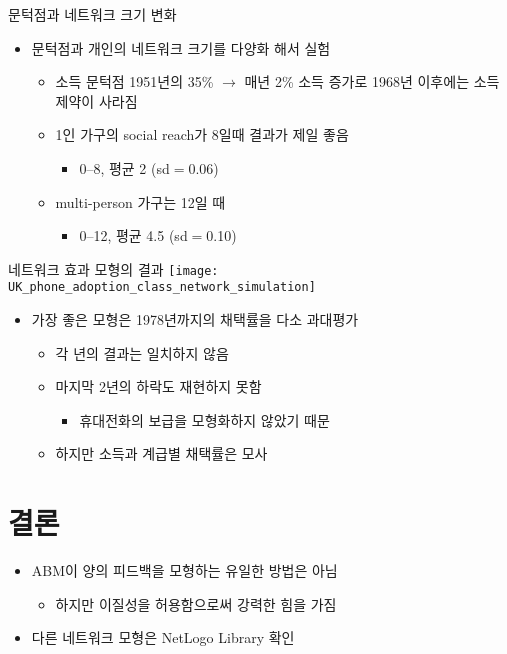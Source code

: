 \documentclass[hyperref={unicode}]{beamer}
\begin{document}
\begin{frame}{문턱점과 네트워크 크기 변화}
\begin{itemize}
\item 문턱점과 개인의 네트워크 크기를 다양화 해서 실험
	\begin{itemize}
	\item 소득 문턱점 1951년의 35\% $\rightarrow$ 매년 2\% 소득 증가로 1968년 이후에는 소득 제약이 사라짐
	\item 1인 가구의 social reach가 8일때 결과가 제일 좋음
		\begin{itemize}
		\item 0--8, 평균 2 (sd$=$0.06)
		\end{itemize}
	\item multi-person 가구는 12일 때
		\begin{itemize}
		\item 0--12, 평균 4.5 (sd$=$0.10)
		\end{itemize}
	\end{itemize}
\end{itemize}	
\end{frame}

\begin{frame}{네트워크 효과 모형의 결과}
\texttt{[image: UK\_phone\_adoption\_class\_network\_simulation]}	
\begin{itemize}
\item 가장 좋은 모형은 1978년까지의 채택률을 다소 과대평가
	\begin{itemize}
	\item 각 년의 결과는 일치하지 않음 
	\item 마지막 2년의 하락도 재현하지 못함
		\begin{itemize}
		\item 휴대전화의 보급을 모형화하지 않았기 때문
		\end{itemize}
	\item 하지만 소득과 계급별 채택률은 모사
	\end{itemize}
\end{itemize}
\end{frame}



\section{결론}
\begin{frame}
\begin{itemize}
\item ABM이 양의 피드백을 모형하는 유일한 방법은 아님
	\begin{itemize}
	\item 하지만 이질성을 허용함으로써 강력한 힘을 가짐
	\end{itemize}
\item 다른 네트워크 모형은 NetLogo Library 확인
\end{itemize}	
\end{frame}


\begin{frame}

\end{frame}

	
\end{document}
